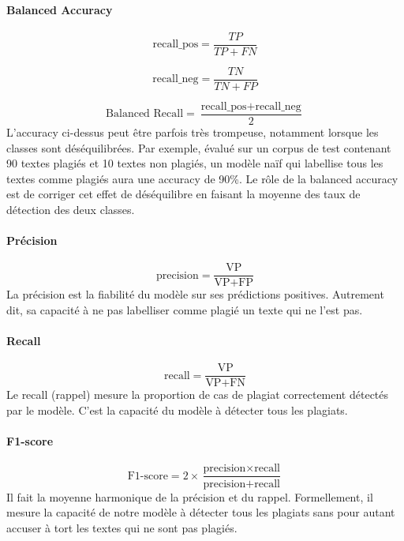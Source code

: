 \paragraph{Balanced Accuracy}
\begin{equation}
\text{recall\_pos} = \frac{TP}{TP + FN}
\end{equation}

\begin{equation}
\text{recall\_neg} = \frac{TN}{TN + FP}
\end{equation}

\begin{equation}
\text{Balanced Recall} = \frac{\text{recall\_pos} + \text{recall\_neg}}{2}
\end{equation}
L'accuracy ci-dessus peut être parfois très trompeuse, notamment lorsque les classes sont déséquilibrées. Par exemple, évalué sur un corpus de test contenant 90 textes plagiés et 10 textes non plagiés, un modèle naïf qui labellise tous les textes comme plagiés aura une accuracy de 90\%. Le rôle de la balanced accuracy est de corriger cet effet de déséquilibre en faisant la moyenne des taux de détection des deux classes.

\paragraph{Précision}
\[
\text{precision} = \frac{\text{VP}}{\text{VP} + \text{FP}}
\]
La précision est la fiabilité du modèle sur ses prédictions positives. Autrement dit, sa capacité à ne pas labelliser comme plagié un texte qui ne l'est pas.

\paragraph{Recall}
\[
\text{recall} = \frac{\text{VP}}{\text{VP} + \text{FN}}
\]
Le recall (rappel) mesure la proportion de cas de plagiat correctement détectés par le modèle. C'est la capacité du modèle à détecter tous les plagiats.

\paragraph{F1-score}
\[
\text{F1-score} = 2 \times \frac{\text{precision} \times \text{recall}}{\text{precision} + \text{recall}}
\]
Il fait la moyenne harmonique de la précision et du rappel. Formellement, il mesure la capacité de notre modèle à détecter tous les plagiats sans pour autant accuser à tort les textes qui ne sont pas plagiés.

